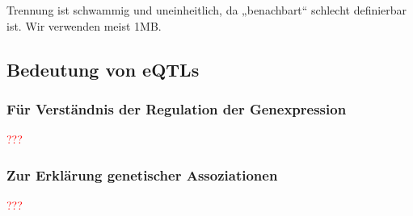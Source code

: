 Trennung ist schwammig und uneinheitlich, da „benachbart“ schlecht definierbar ist. Wir verwenden meist 1MB.

\subsection{Bedeutung von eQTLs}

\subsubsection{Für Verständnis der Regulation der Genexpression}
\textcolor{red}{???}
\subsubsection{Zur Erklärung genetischer Assoziationen}
\textcolor{red}{???}